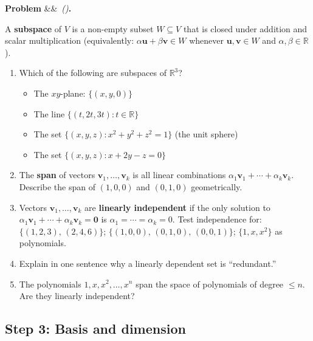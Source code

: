 \documentclass[12pt, a4paper]{article}
\newcounter{problem}
\newenvironment{problem}[1][]{%
  \refstepcounter{problem}%
  \par\vspace{6pt}%
  \noindent\textbf{\color{MidBlue}Problem \theproblem}%
  \ifx&#1&\else\ \textit{(#1)}\fi\textbf{.}\enskip
}{\par\vspace{4pt}}
\begin{document}
\begin{problem}
\label{prob:subspace}
A \textbf{subspace} of $V$ is a non-empty subset $W \subseteq V$ that is closed under addition and scalar multiplication (equivalently: $\alpha \mathbf{u} + \beta \mathbf{v} \in W$ whenever $\mathbf{u}, \mathbf{v} \in W$ and $\alpha, \beta \in \mathbb{R}$).

\begin{enumerate}[label=(\alph*), topsep=2pt]
  \item Which of the following are subspaces of $\mathbb{R}^3$?
    \begin{itemize}[noitemsep]
      \item The $xy$-plane: $\{(x,y,0)\}$
      \item The line $\{(t, 2t, 3t) : t \in \mathbb{R}\}$
      \item The set $\{(x,y,z) : x^2 + y^2 + z^2 = 1\}$ (the unit sphere)
      \item The set $\{(x,y,z) : x + 2y - z = 0\}$
    \end{itemize}
  \item The \textbf{span} of vectors $\mathbf{v}_1, \ldots, \mathbf{v}_k$ is all linear combinations $\alpha_1\mathbf{v}_1 + \cdots + \alpha_k\mathbf{v}_k$. Describe the span of $(1,0,0)$ and $(0,1,0)$ geometrically.
  \item Vectors $\mathbf{v}_1, \ldots, \mathbf{v}_k$ are \textbf{linearly independent} if the only solution to $\alpha_1\mathbf{v}_1 + \cdots + \alpha_k\mathbf{v}_k = \mathbf{0}$ is $\alpha_1 = \cdots = \alpha_k = 0$. Test independence for: $\{(1,2,3),\, (2,4,6)\}$; $\{(1,0,0),\, (0,1,0),\, (0,0,1)\}$; $\{1, x, x^2\}$ as polynomials.
  \item Explain in one sentence why a linearly dependent set is ``redundant.''
  \item The polynomials $1, x, x^2, \ldots, x^n$ span the space of polynomials of degree $\leq n$. Are they linearly independent?
\end{enumerate}
\end{problem}

\subsection{Step 3: Basis and dimension}
\end{document}
